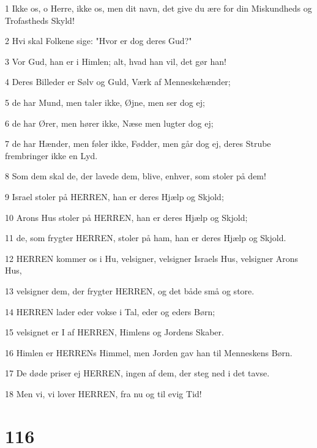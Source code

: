 \par 1 Ikke os, o Herre, ikke os, men dit navn, det give du ære for din Miskundheds og Trofastheds Skyld!
\par 2 Hvi skal Folkene sige: "Hvor er dog deres Gud?"
\par 3 Vor Gud, han er i Himlen; alt, hvad han vil, det gør han!
\par 4 Deres Billeder er Sølv og Guld, Værk af Menneskehænder;
\par 5 de har Mund, men taler ikke, Øjne, men ser dog ej;
\par 6 de har Ører, men hører ikke, Næse men lugter dog ej;
\par 7 de har Hænder, men føler ikke, Fødder, men går dog ej, deres Strube frembringer ikke en Lyd.
\par 8 Som dem skal de, der lavede dem, blive, enhver, som stoler på dem!
\par 9 Israel stoler på HERREN, han er deres Hjælp og Skjold;
\par 10 Arons Hus stoler på HERREN, han er deres Hjælp og Skjold;
\par 11 de, som frygter HERREN, stoler på ham, han er deres Hjælp og Skjold.
\par 12 HERREN kommer os i Hu, velsigner, velsigner Israels Hus, velsigner Arons Hus,
\par 13 velsigner dem, der frygter HERREN, og det både små og store.
\par 14 HERREN lader eder vokse i Tal, eder og eders Børn;
\par 15 velsignet er I af HERREN, Himlens og Jordens Skaber.
\par 16 Himlen er HERRENs Himmel, men Jorden gav han til Menneskens Børn.
\par 17 De døde priser ej HERREN, ingen af dem, der steg ned i det tavse.
\par 18 Men vi, vi lover HERREN, fra nu og til evig Tid!

\chapter{116}

